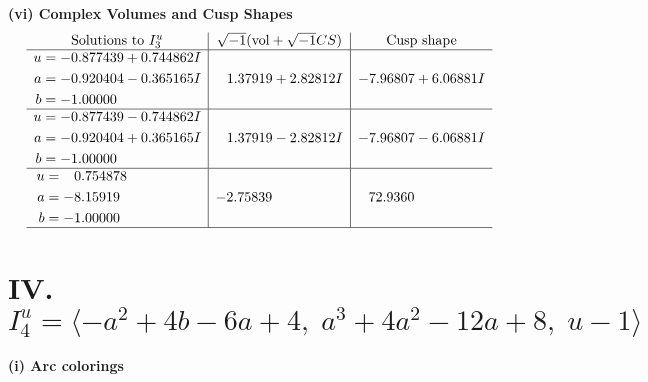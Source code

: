 \documentclass[1p]{elsarticle_modified}
\theoremstyle{definition}
\newcommand{\I}{\sqrt{-1}}
\begin{document}
\newpage\flushleft \textbf{(vi) Complex Volumes and Cusp Shapes}
$$\begin{array}{c|c|c}  
\text{Solutions to }I^u_{3}& \I (\text{vol} + \sqrt{-1}CS) & \text{Cusp shape}\\
 \hline 
\begin{aligned}
u &= -0.877439 + 0.744862 I \\
a &= -0.920404 - 0.365165 I \\
b &= -1.00000\phantom{ +0.000000I}\end{aligned}
 & \phantom{-}1.37919 + 2.82812 I & -7.96807 + 6.06881 I \\ \hline\begin{aligned}
u &= -0.877439 - 0.744862 I \\
a &= -0.920404 + 0.365165 I \\
b &= -1.00000\phantom{ +0.000000I}\end{aligned}
 & \phantom{-}1.37919 - 2.82812 I & -7.96807 - 6.06881 I \\ \hline\begin{aligned}
u &= \phantom{-}0.754878\phantom{ +0.000000I} \\
a &= -8.15919\phantom{ +0.000000I} \\
b &= -1.00000\phantom{ +0.000000I}\end{aligned}
 & -2.75839\phantom{ +0.000000I} & \phantom{-}72.9360\phantom{ +0.000000I}\\
 \hline 
 \end{array}$$\newpage\newpage\renewcommand{\arraystretch}{1}
\centering \section*{IV. $I^u_{4}= \langle - a^2+4 b-6 a+4,\;a^3+4 a^2-12 a+8,\;u-1 \rangle$}
\flushleft \textbf{(i) Arc colorings}\\
\end{document}
